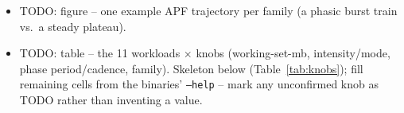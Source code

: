 \documentclass[conference]{IEEEtran}
\begin{document}
\begin{itemize}
\begin{itemize}
      \item STEADY -- \texttt{mem\_pagefault\_density\_v2}: page-fault-density
            driver. %
      \item STEADY -- \texttt{mem\_rmw\_intensity\_v2}: read-modify-write
            intensity sweep.
      \item STEADY -- \texttt{mem\_writemag\_sweep\_v2}: write-magnitude sweep.
      \item STEADY -- \texttt{app\_hashtable\_intensive\_v2}: hashtable
            build $\to$ probe (two-phase / bimodal trajectory). Labeled steady,
            scored with CV primary plus incidental F1; a dedicated bimodal
            metric is deferred.
    \end{itemize}
  \item TODO: figure -- one example APF trajectory per family (a phasic
        burst train vs.\ a steady plateau).
  \item TODO: table -- the 11 workloads $\times$ knobs (working-set-mb,
        intensity/mode, phase period/cadence, family). Skeleton below
        (Table~\ref{tab:knobs}); fill remaining cells from the binaries'
        \texttt{--help} -- mark any unconfirmed knob as TODO rather than
        inventing a value.
\end{itemize}
\end{document}
